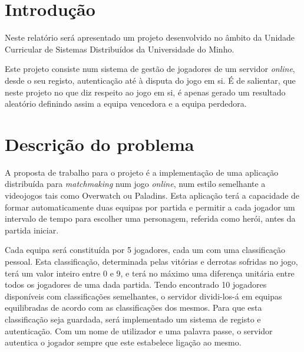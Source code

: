 \documentclass[a4paper]{article}
\begin{document}



\tableofcontents

\pagebreak
\section{Introdução}
\label{sec:1}

\hspace{3mm} Neste relatório será apresentado um projeto desenvolvido no âmbito da Unidade Curricular de Sistemas Distribuídos da Universidade do Minho.

\par Este projeto consiste num sistema de gestão de jogadores de um servidor \emph{online}, desde o seu registo, autenticação até à disputa do jogo em si. É de salientar, que neste projeto no que diz respeito ao jogo em si, é apenas gerado um resultado aleatório definindo assim a equipa vencedora e a equipa perdedora.




\section{Descrição do problema}
\label{sec:2}

\hspace{3mm} A proposta de trabalho para o projeto é a implementação de uma aplicação distribuída para \textit{matchmaking} num jogo \textit{online}, num estilo semelhante a videojogos tais como Overwatch ou Paladins. Esta aplicação terá a capacidade de formar automaticamente duas equipas por partida e permitir a cada jogador um intervalo de tempo para escolher uma personagem, referida como herói, antes da partida iniciar.

\par Cada equipa será constituída por 5 jogadores, cada um com uma classificação pessoal. Esta classificação, determinada pelas vitórias e derrotas sofridas no jogo, terá um valor inteiro entre 0 e 9, e terá no máximo uma diferença unitária entre todos os jogadores de uma dada partida. Tendo encontrado 10 jogadores disponíveis com classificações semelhantes, o servidor dividi-los-á em equipas equilibradas de acordo com as classificações dos mesmos. Para que esta classificação seja guardada, será implementado um sistema de registo e autenticação. Com um nome de utilizador e uma palavra passe, o servidor autentica o jogador sempre que este estabelece ligação ao mesmo.
\end{document}
